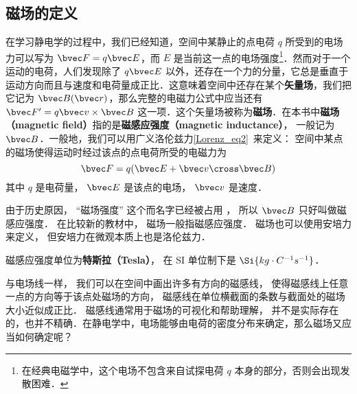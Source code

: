 
\begin{issues}
\issueDraft
\end{issues}

\subsection{磁场的定义}
在学习静电学的过程中，我们已经知道，空间中某静止的点电荷 $q$ 所受到的电场力可以写为 $\bvec F=q\bvec E$，而 $E$ 是当前这一点的电场强度\footnote{在经典电磁学中，这个电场不包含来自试探电荷 $q$ 本身的部分，否则会出现发散困难．}．然而对于一个运动的电荷，人们发现除了 $q\bvec E$ 以外，还存在一个力的分量，它总是垂直于运动方向而且与速度和电荷量成正比．这意味着空间中还存在某个\textbf{矢量场}，我们把它记为 $\bvec B(\bvec r)$，那么完整的电磁力公式中应当还有 $\bvec F'=q\bvec v\times \bvec B$ 这一项．这个矢量场被称为\textbf{磁场}．在本书中\textbf{磁场（magnetic field）}指的是\textbf{磁感应强度（magnetic inductance）}， 一般记为 $\bvec B$．一般地，我们可以用广义洛伦兹力\autoref{Lorenz_eq2}~来定义： 空间中某点的磁场使得运动时经过该点的点电荷所受的电磁力为
\begin{equation}
\bvec F = q(\bvec E + \bvec v \cross \bvec B)
\end{equation}
其中 $q$ 是电荷量， $\bvec E$ 是该点的电场， $\bvec v$ 是速度．

由于历史原因， “磁场强度” 这个而名字已经被占用%
， 所以 $\bvec B$ 只好叫做磁感应强度． 在比较新的教材中， 磁场一般指磁感应强度． 磁场也可以使用安培力来定义， 但安培力在微观本质上也是洛伦兹力． 


磁感应强度单位为\textbf{特斯拉（Tesla）}， 在 SI 单位制下是 $\Si{kg\cdot C^{-1}s^{-1}}$．

与电场线一样， 我们可以在空间中画出许多有方向的磁感线， 使得磁感线上任意一点的方向等于该点处磁场的方向， 磁感线在单位横截面的条数与截面处的磁场大小近似成正比． 磁感线通常用于磁场的可视化和帮助理解， 并不是实际存在的，也并不精确．在静电学中，电场能够由电荷的密度分布来确定，那么磁场又应当如何确定呢？
